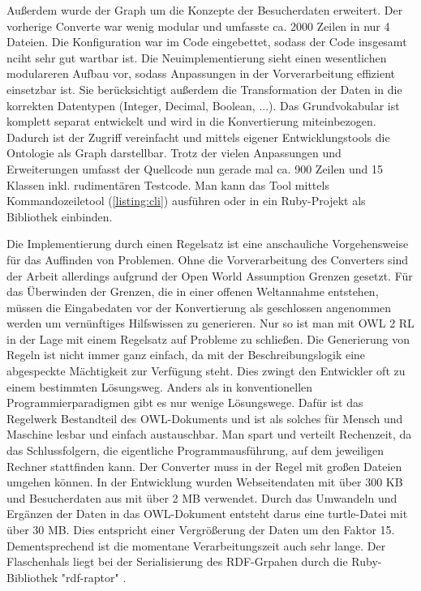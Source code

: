 \documentclass[runningheads,a4paper]{llncs}
\begin{document}
Außerdem wurde der Graph um die Konzepte der Besucherdaten erweitert.
Der vorherige Converte war wenig modular und umfasste ca. 2000 Zeilen in nur 4 Dateien.
Die Konfiguration war im Code eingebettet, sodass der Code insgesamt nciht sehr gut wartbar ist.
Die Neuimplementierung sieht einen wesentlichen modulareren Aufbau vor, sodass Anpassungen in der Vorverarbeitung effizient einsetzbar ist.
Sie berücksichtigt außerdem die Transformation der Daten in die korrekten Datentypen (Integer, Decimal, Boolean, ...).
Das Grundvokabular ist komplett separat entwickelt und wird in die Konvertierung miteinbezogen.
Dadurch ist der Zugriff vereinfacht und mittels eigener Entwicklungstools die Ontologie als Graph darstellbar.
Trotz der vielen Anpassungen und Erweiterungen umfasst der Quellcode nun gerade mal ca. 900 Zeilen und 15 Klassen inkl. rudimentären Testcode.
Man kann das Tool mittels Kommandozeiletool (\ref{listing:cli}) ausführen oder in ein Ruby-Projekt als Bibliothek einbinden.



Die Implementierung durch einen Regelsatz ist eine anschauliche Vorgehensweise für das Auffinden von Problemen. 
Ohne die Vorverarbeitung des Converters sind der Arbeit allerdings aufgrund der Open World Assumption Grenzen gesetzt.
Für das Überwinden der Grenzen, die in einer offenen Weltannahme entstehen, müssen die Eingabedaten vor der Konvertierung als geschlossen angenommen werden um vernünftiges Hilfswissen zu generieren.
Nur so ist man mit OWL 2 RL in der Lage mit einem Regelsatz auf Probleme zu schließen.
Die Generierung von Regeln ist nicht immer ganz einfach, da mit der Beschreibungslogik eine abgespeckte Mächtigkeit zur Verfügung steht. 
Dies zwingt den Entwickler oft zu einem bestimmten Lösungsweg.
Anders als in konventionellen Programmierparadigmen gibt es nur wenige Lösungswege.
Dafür ist das Regelwerk Bestandteil des OWL-Dokuments und ist als solches für Mensch und Maschine lesbar und einfach austauschbar.
Man spart und verteilt Rechenzeit, da das Schlussfolgern, die eigentliche Programmausführung, auf dem jeweiligen Rechner stattfinden kann.
Der Converter muss in der Regel mit großen Dateien umgehen können.
In der Entwicklung wurden Webseitendaten mit über 300 KB und Besucherdaten aus mit über 2 MB verwendet.
Durch das Umwandeln und Ergänzen der Daten in das OWL-Dokument entsteht darus eine turtle-Datei mit über 30 MB.
Dies entspricht einer Vergrößerung der Daten um den Faktor 15.
Dementsprechend ist die momentane Verarbeitungszeit auch sehr lange.
Der Flaschenhals liegt bei der Serialisierung des RDF-Grpahen durch die Ruby-Bibliothek {}"rdf-raptor{}" \cite{rdf-raptor}.



\nocite{url_dl_primer}



\end{document}

